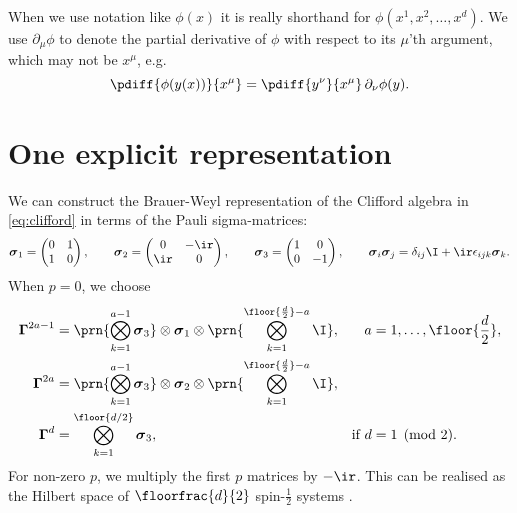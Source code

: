 \documentclass[11pt]{article}
\newcommand{\Gammab}{\boldsymbol{\Gamma}}
\newcommand{\sigmab}{\boldsymbol{\sigma}}
\begin{document}
When we use notation like \(\phi(x)\) it is really shorthand for \(\phi(x^1,x^2,\ldots,x^d)\).
We use \(\partial_\mu\phi\) to denote the partial derivative of \(\phi\) with respect to its \(\mu\)'th argument, which may not be \(x^\mu\), e.g.
%
\begin{equation*}
  \pdiff{\phi(y(x))}{x^\mu} = \pdiff{y^\nu}{x^\mu} \, \partial_\nu \phi(y).
\end{equation*}
%




\section{One explicit representation}\label{sec:explicit}

We can construct the Brauer-Weyl representation \cite{brauer1935spinors} of the Clifford algebra in \cref{eq:clifford} in terms of the Pauli sigma-matrices:
%
\begin{equation}\label{eq:paulisigma}
  \sigmab_1 = \begin{pmatrix}
                0 & 1 \\
                1 & 0 \\
              \end{pmatrix}
  , \qquad
  \sigmab_2 = \begin{pmatrix}
                0   & -\ir \\
                \ir & 0    \\
              \end{pmatrix}
  , \qquad
  \sigmab_3 = \begin{pmatrix}
                1 & 0  \\
                0 & -1 \\
              \end{pmatrix}
  , \qquad
  \sigmab_i \sigmab_j = \delta_{ij} \I + \ir \epsilon_{ijk} \sigmab_k.
\end{equation}
%
When $p=0$, we choose
%
\begin{equation}\label{eq:explicit}
\begin{aligned}
  \Gammab^{2a-1} &= \prn{\bigotimes_{k=1}^{a-1} \sigmab_3}
                    \otimes \sigmab_1 \otimes
                    \prn{\bigotimes_{k=1}^{\floor{\frac{d}{2}}-a} \I}, &
    a &= 1, \ldots, \floor{\frac{d}{2}}, \\
  \Gammab^{2a} &= \prn{\bigotimes_{k=1}^{a-1} \sigmab_3}
                  \otimes \sigmab_2 \otimes
                  \prn{\bigotimes_{k=1}^{\floor{\frac{d}{2}}-a} \I}, \\
  \Gammab^d &= \bigotimes_{k=1}^{\floor{d/2}} \sigmab_3, &
    \text{if }
    d &= 1 \pmod 2.
\end{aligned}
\end{equation}
%
For non-zero $p$, we multiply the first $p$ matrices by $-\ir$.
This can be realised as the Hilbert space of $\floorfrac{d}{2}$ spin-$\frac{1}{2}$ systems
\cite{Strathdee:1987jr,strathdee1986extended}.
\end{document}

